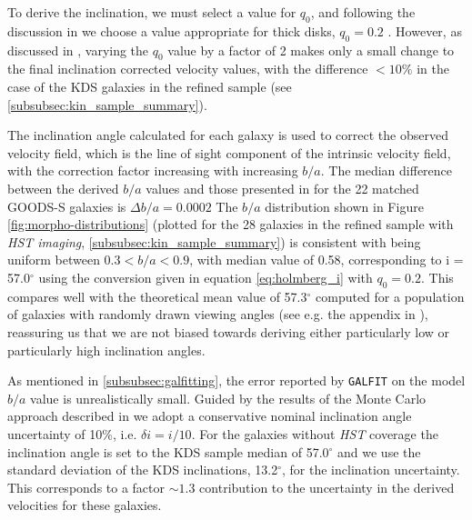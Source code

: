 \documentclass[fleqn,usenatbib]{mn2e}
\begin{document}
To derive the inclination, we must select a value for $q_{0}$, and following the discussion in \citep{Law2012a} we choose a value appropriate for thick disks, $q_{0} = 0.2$ \citep[e.g.][]{Epinat2012,Harrison2017}.
However, as discussed in \cite{Harrison2017}, varying the $q_{0}$ value by a factor of 2 makes only a small change to the final inclination corrected velocity values, with the difference $<10\%$ in the case of the KDS galaxies in the refined sample (see \cref{subsubsec:kin_sample_summary}).

The inclination angle calculated for each galaxy is used to correct the observed velocity field, which is the line of sight component of the intrinsic velocity field, with the correction factor increasing with increasing $b/a$.
The median difference between the derived $b/a$ values and those presented in \cite{VanderWel2012} for the 22 matched GOODS-S galaxies is $\Delta b/a = 0.0002$
The $b/a$ distribution shown in Figure \ref{fig:morpho-distributions} (plotted for the 28 galaxies in the refined sample with {\em HST imaging}, \cref{subsubsec:kin_sample_summary}) is consistent with being uniform between $0.3 < b/a < 0.9$, with median value of 0.58, corresponding to i = 57.0$^{\circ}$ using the conversion given in equation \ref{eq:holmberg_i} with $q_{0}=0.2$.
This compares well with the theoretical mean value of 57.3$^{\circ}$ computed for a population of galaxies with randomly drawn viewing angles (see e.g. the appendix in \cite{Law2009}), reassuring us that we are not biased towards deriving either particularly low or particularly high inclination angles.

As mentioned in \cref{subsubsec:galfitting}, the error reported by {\tt GALFIT} on the model $b/a$ value is unrealistically small.
Guided by the results of the Monte Carlo approach described in \cite{Epinat2012} we adopt a conservative nominal inclination angle uncertainty of 10$\%$, i.e. $\delta i = i / 10$.
For the galaxies without {\em HST} coverage the inclination angle is set to the KDS sample median of 57.0$^{\circ}$ and we use the standard deviation of the KDS inclinations, 13.2$^{\circ}$, for the inclination uncertainty.
This corresponds to a factor $\sim1.3$ contribution to the uncertainty in the derived velocities for these galaxies.
\end{document}
